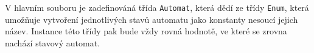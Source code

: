 V hlavním souboru je zadefinováná třída \texttt{Automat}, která dědí ze třídy \texttt{Enum}, která umožňuje vytvoření jednotlivých stavů automatu jako konstanty nesoucí jejich název. Instance této třídy pak bude vždy rovná hodnotě, ve které se zrovna nachází stavový automat.

%





